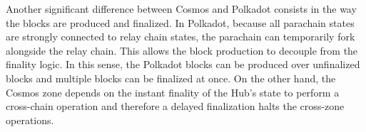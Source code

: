Another significant difference between Cosmos and Polkadot consists in the way the blocks are produced and finalized. In Polkadot, because all parachain states are strongly connected to relay chain states, the parachain can temporarily fork alongside the relay chain. This allows the block production to decouple from the finality logic. In this sense, the Polkadot blocks can be produced over unfinalized blocks and multiple blocks can be finalized at once. On the other hand, the Cosmos zone depends on the instant finality of the Hub's state to perform a cross-chain operation and therefore a delayed finalization halts the cross-zone operations.
